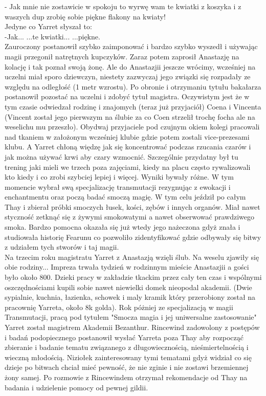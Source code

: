 \documentclass{article}
\begin{document}
    - Jak mnie nie zostawicie w spokoju to wyrwę wam te kwiatki z koszyka i z waszych dup zrobię sobie piękne flakony na kwiaty!\\

    Jedyne co Yarret słyszał to:\\

    -Jak... ...te kwiatki... ...piękne.\\

    Zauroczony postanowił szybko zaimponować i bardzo szybko wyszedł i używając magii przegonił natrętnych kupczyków. Zaraz potem zaprosił Anastazję na kolację i tak poznał swoją żonę. Ale do Anastazjii jeszcze wrócimy, wcześniej na uczelni miał sporo dziewczyn, niestety zazwyczaj jego związki się rozpadały ze względu na odległość (1 metr wzrostu). Po obronie i otrzymaniu tytułu bakałarza postanowił pozostać na uczelni i zdobyć tytuł magistra. Oczywistym jest że w tym czasie odwiedzał rodzinę i znajomych (teraz już przyjaciół) Coena i Vincenta (Vincent został jego pierwszym na ślubie za co Coen strzelił trochę focha ale na weselichu mu przeszło). Obydwaj przyjaciele pod czujnym okiem kolegi pracowali nad tkaniem w założonym wcześniej klubie gdzie potem zostali vice-prezesami klubu. A Yarret chłoną więdzę jak się koncentrować podczas rzucania czarów i jak można używać krwi aby czary wzmocnić. Szczególnie przydatny był tu trening jaki mieli we trzech poza zajęciami, kiedy na placu często rywalizowali kto kiedy i co zrobi szybciej lepiej i więcej. Wyniki bywały różne. W tym momencie wybrał swą specjalizację transmutacji rezygnując z ewokacji i enchantmentu oraz począ badać smoczą magię. W tym celu jeździł po całym Thay i zbierał próbki smoczych łusek, kości, zębów i innych organów. Miał nawet styczność zetknąć się z żywymi smokowatymi a nawet obserwować prawdziwego smoka. Bardzo pomocna okazała się już wtedy jego nażeczona gdyż znała i studiowała historię Fearunu co pozwoliło zidentyfikować gdzie odbywały się bitwy z udziałem tych stworów i taj magii.\\

    Na trzecim roku magistratu Yarret z Anastazją wzięli ślub. Na weselu zjawiły się obie rodziny... Impreza trwała tydzień w rodzinnym mieście Anastazjii a gości było około 800. Dzieki pracy w zakładzie tkackim przez cały ten czas i wspólnymi oszczędnościami kupili sobie nawet niewielki domek nieopodal akademii. (Dwie sypialnie, kuchnia, łazienka, schowek i maly kramik który przerobiony został na pracownię Yarreta, około 8k golda). Rok póżniej ze specjalizacją w magii Transmutacji, pracą pod tytułem "Smocza magia i jej uniwersalne zastosowanie" Yarret został magistrem Akademii Bezanthur. Rincewind zadowolony z postępów i badań podopiecznego postanowił wysłać Yarreta poza Thay aby rozpocząć zbieranie i badanie tematu związanego z długowiecznością, nieśmiertelnością i wieczną młodością. Niziołek zainteresowany tymi tematami gdyż widział co się dzieje po bitwach chciał mieć pewność, że nie zginie i nie zostawi brzemiennej żony samej. Po rozmowie z Rincewindem otrzymał rekomendacje od Thay na badania i udzielenie pomocy od pewnej gildii.\\



    
\end{document}
